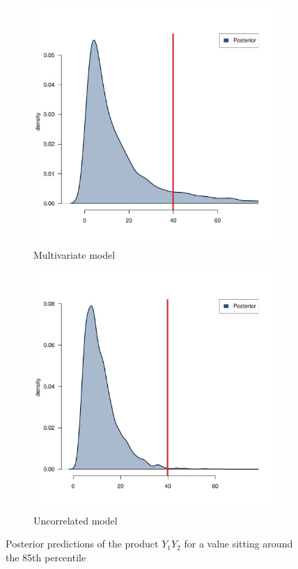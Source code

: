 \begin{figure}[htb]
	\centering
	\begin{subfigure}{0.4\textwidth}
		\includegraphics{./Figures/85th-percentile_corr.pdf}
		\caption{Multivariate model}
	\end{subfigure}
	\hfil
	\begin{subfigure}{0.4\textwidth}
		\includegraphics{./Figures/85th-percentile_uncorr.pdf}
		\caption{Uncorrelated model}
	\end{subfigure}
	\caption{Posterior predictions of the product \( Y_1 Y_2 \) for a value sitting around the 85\textup{th} percentile}
	\label{fig::res-85}
\end{figure}


